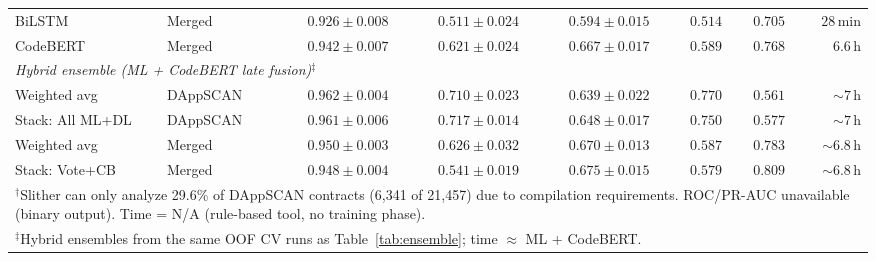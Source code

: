 \begin{table}[t]
{\begin{tabular}{llcccccr}
BiLSTM & Merged & $0.926 \pm 0.008$ & $0.511 \pm 0.024$ & $0.594 \pm 0.015$ & $0.514$ & $0.705$ & $28$\,min \\
CodeBERT & Merged & $0.942 \pm 0.007$ & $0.621 \pm 0.024$ & $0.667 \pm 0.017$ & $0.589$ & $0.768$ & $6.6$\,h \\
\midrule
\multicolumn{8}{l}{\textit{Hybrid ensemble (ML + CodeBERT late fusion)$^{\ddagger}$}} \\
Weighted avg & DAppSCAN & $\mathbf{0.962} \pm 0.004$ & $0.710 \pm 0.023$ & $0.639 \pm 0.022$ & $0.770$ & $0.561$ & ${\sim}7$\,h \\
Stack: All ML+DL & DAppSCAN & $0.961 \pm 0.006$ & $\mathbf{0.717} \pm 0.014$ & $0.648 \pm 0.017$ & $0.750$ & $0.577$ & ${\sim}7$\,h \\
Weighted avg & Merged & $0.950 \pm 0.003$ & $0.626 \pm 0.032$ & $0.670 \pm 0.013$ & $0.587$ & $0.783$ & ${\sim}6.8$\,h \\
Stack: Vote+CB & Merged & $0.948 \pm 0.004$ & $0.541 \pm 0.019$ & $\mathbf{0.675} \pm 0.015$ & $0.579$ & $\mathbf{0.809}$ & ${\sim}6.8$\,h \\
\bottomrule
\multicolumn{8}{l}{\scriptsize $^{\dagger}$Slither can only analyze 29.6\% of DAppSCAN contracts (6,341 of 21,457) due to compilation requirements. ROC/PR-AUC unavailable (binary output). Time = N/A (rule-based tool, no training phase).}\\
\multicolumn{8}{l}{\scriptsize $^{\ddagger}$Hybrid ensembles from the same OOF CV runs as Table~\ref{tab:ensemble}; time $\approx$ ML + CodeBERT.}
\end{tabular}}
\end{table}
